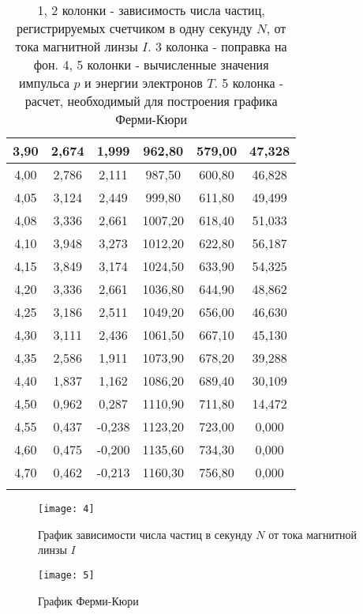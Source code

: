 \documentclass[a4paper, 12pt]{article}
\begin{document}
\begin{longtable}{|c|c|c|c|c|c|}
3,90 & 2,674 & 1,999  & 962,80   & 579,00 & 47,328   \\ \hline
4,00 & 2,786 & 2,111  & 987,50   & 600,80 & 46,828   \\ \hline
4,05 & 3,124 & 2,449  & 999,80   & 611,80 & 49,499   \\ \hline
4,08 & 3,336 & 2,661  & 1007,20  & 618,40 & 51,033   \\ \hline
4,10 & 3,948 & 3,273  & 1012,20  & 622,80 & 56,187   \\ \hline
4,15 & 3,849 & 3,174  & 1024,50  & 633,90 & 54,325   \\ \hline
4,20 & 3,336 & 2,661  & 1036,80  & 644,90 & 48,862   \\ \hline
4,25 & 3,186 & 2,511  & 1049,20  & 656,00 & 46,630   \\ \hline
4,30 & 3,111 & 2,436  & 1061,50  & 667,10 & 45,130   \\ \hline
4,35 & 2,586 & 1,911  & 1073,90  & 678,20 & 39,288   \\ \hline
4,40 & 1,837 & 1,162  & 1086,20  & 689,40 & 30,109   \\ \hline
4,50 & 0,962 & 0,287  & 1110,90  & 711,80 & 14,472   \\ \hline
4,55 & 0,437 & -0,238 & 1123,20  & 723,00 & 0,000    \\ \hline
4,60 & 0,475 & -0,200 & 1135,60  & 734,30 & 0,000    \\ \hline
4,70 & 0,462 & -0,213 & 1160,30  & 756,80 & 0,000    \\ \hline

\caption{1, 2 колонки - зависимость числа частиц, регистрируемых счетчиком в одну
    секунду $N$, от тока магнитной линзы $I$. 3 колонка - поправка на
    фон. 4, 5 колонки -  вычисленные
значения импульса $p$ и энергии электронов $T$. 5 колонка - расчет,
необходимый для построения графика Ферми-Кюри }
    
\end{longtable}



\begin{figure}[H]
    \texttt{[image: 4]} 
    \caption{График зависимости числа частиц в секунду $N$ от тока
    магнитной линзы $I$}
    \label{fig:4}
\end{figure}


\begin{figure}[H]
    \texttt{[image: 5]} 
    \caption{График Ферми-Кюри}
    \label{fig:5}
\end{figure}
\end{document}
